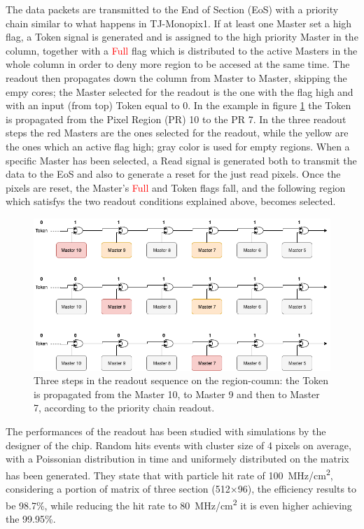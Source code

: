         The data packets are transmitted to the End of Section (EoS) with a priority chain similar to what happens in TJ-Monopix1. 
        If at least one Master set a high flag, a \textcolor{Cerulean}{Token} signal is generated and is assigned to the high priority Master in the column, together with a \textcolor{red}{Full} flag which is distributed to the active Masters in the whole column in order to deny more region to be accesed at the same time.
        The readout then propagates down the column from Master to Master, skipping the empy cores; the Master selected for the readout is the one with the flag high and with an input (from top) \textcolor{Cerulean}{Token} equal to 0. 
        In the example in figure \ref{fig:token_chain} the \textcolor{Cerulean}{Token} is propagated from the Pixel Region (PR) 10 to the PR 7. 
        In the three readout steps the red Masters are the ones selected for the readout, while the yellow are the ones which an active flag high; gray color is used for empty regions. When a specific Master has been selected, a \textcolor{Cerulean}{Read} signal is generated both to transmit the data to the EoS and also to generate a reset for the just read pixels.
        Once the pixels are reset, the Master's \textcolor{red}{Full} 
        and \textcolor{Cerulean}{Token} flags fall, and the following region which satisfys the two readout conditions explained above, becomes selected. 
        \begin{figure}[h!]
            \centering
            \includegraphics[width=.95\linewidth]{figures/ARCADIA/token_chain.png}
            \caption{Three steps in the readout sequence on the region-coumn: the Token is propagated from the Master 10, to Master 9 and then to Master 7, according to the priority chain readout.}
            \label{fig:token_chain}
        \end{figure}

    The performances of the readout has been studied with simulations by the designer of the chip. 
    Random hits events with cluster size of 4 pixels on average, with a Poissonian distribution in time and uniformely distributed on the matrix has been generated.
    They state that with particle hit rate of \SI{100}{MHz/cm\squared}, considering a portion of matrix of three section (512$\times$96), the efficiency results to be 98.7\%, while reducing the hit rate to \SI{80}{MHz/cm\squared} it is even higher achieving the 99.95\%. 


